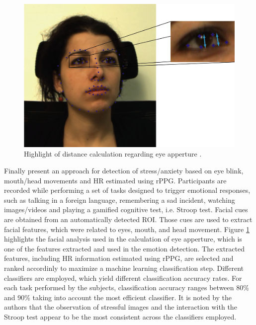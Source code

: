 \begin{figure}[h]
    \centering
    \includegraphics[width=\linewidth]{figures/giannakakis2017stress-eye.png}
    \caption{Highlight of distance calculation regarding eye apperture \parencite{giannakakis2017stress}.}
    \label{fig:distance-samara}
\end{figure}

Finally \textcite{giannakakis2017stress} present an approach for detection of stress/anxiety based on eye blink, mouth/head movements and HR estimated using rPPG. Participants are recorded while performing a set of tasks designed to trigger emotional responses, such as talking in a foreign language, remembering a sad incident, watching images/videos and playing a gamified cognitive test, i.e. Stroop test. Facial cues are obtained from an automatically detected ROI. Those cues are used to extract facial features, which were related to eyes, mouth, and head movement. Figure \ref{fig:distance-samara} highlights the facial analysis used in the calculation of eye apperture, which is one of the features extracted and used in the emotion detection. The extracted features, including HR information estimated using rPPG, are selected and ranked accordinly to maximize a machine learning classification step. Different classifiers are employed, which yield different classification accuracy rates. For each task performed by the subjects, classification accuracy ranges between 80\% and 90\% taking into account the most efficient classifier. It is noted by the authors that the observation of stressful images and the interaction with the Stroop test appear to be the most consistent across the classifiers employed.
